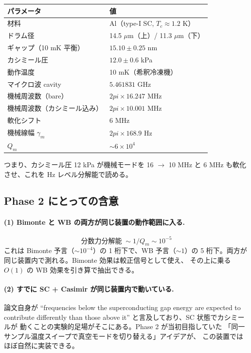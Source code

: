 \documentclass[11pt,a4paper]{article}
\def\pi{pi}%
\def\textbf#1{#1}%
\begin{document}
\begin{center}
\begin{tabular}{ll}
\toprule
パラメータ & 値 \\
\midrule
材料 & Al（type-I SC, $T_c \approx 1.2$ K） \\
ドラム径 & 14.5 $\mu$m（上）/ 11.3 $\mu$m（下） \\
ギャップ（10 mK 平衡） & $15.10 \pm 0.25$ nm \\
カシミール圧 & $12.0 \pm 0.6$ kPa \\
動作温度 & 10 mK（希釈冷凍機） \\
マイクロ波 cavity & $5.461831$ GHz \\
機械周波数（bare） & $2\pi\times 16.247$ MHz \\
機械周波数（カシミール込み） & $2\pi\times 10.001$ MHz \\
\textbf{軟化シフト} & \textbf{6 MHz} \\
機械線幅 $\gamma_m$ & $2\pi\times 168.9$ Hz \\
$Q_m$ & $\sim 6\times 10^4$ \\
\bottomrule
\end{tabular}
\end{center}

つまり、カシミール圧 12 kPa が機械モードを 16 $\to$ 10 MHz と
\textbf{6 MHz も軟化}させ、これを Hz レベル分解能で読める。

\subsection{Phase 2 にとっての含意}

\paragraph{(1) Bimonte と WB の両方が同じ装置の動作範囲に入る.}
\[
  \boxed{\;\text{分数力分解能}\;\sim 1/Q_m \sim 10^{-5}\;}
\]
これは Bimonte 予言（$\sim 10^{-4}$）の 1 桁下で、WB 予言（$\sim 1$）の
5 桁下。\textbf{両方が同じ装置内で測れる}。Bimonte 効果は較正信号として使え、
その上に乗る $O(1)$ の WB 効果を引き算で抽出できる。

\paragraph{(2) すでに SC + Casimir が同じ装置内で動いている.}
論文自身が ``frequencies below the superconducting gap energy are expected to
contribute differently than those above it'' と言及しており、SC 状態でカシミールが
動くことの実験的足場がそこにある。Phase 2 が当初目指していた
「同一サンプル温度スイープで真空モードを切り替える」アイデアが、
この装置ではほぼ自然に実装できる。
\end{document}
